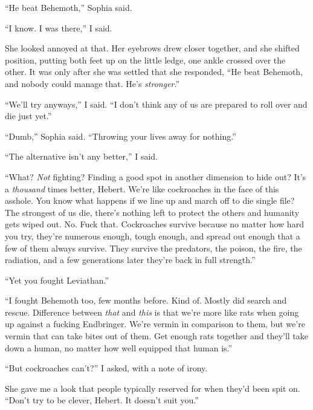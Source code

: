 ``He beat Behemoth,'' Sophia said.



``I know.  I was there,'' I said.



She looked annoyed at that.  Her eyebrows drew closer together, and she shifted position, putting both feet up on the little ledge, one ankle crossed over the other.  It was only after she was settled that she responded, ``He beat Behemoth, and nobody could manage that.  He's \emph{stronger}.''



``We'll try anyways,'' I said.  ``I don't think any of us are prepared to roll over and die just yet.''



``Dumb,'' Sophia said.  ``Throwing your lives away for nothing.''



``The alternative isn't any better,'' I said.



``What?  \emph{Not} fighting?  Finding a good spot in another dimension to hide out?  It's a \emph{thousand} times better, Hebert.  We're like cockroaches in the face of this asshole.  You know what happens if we line up and march off to die single file?  The strongest of us die, there's nothing left to protect the others and humanity gets wiped out.  No.  Fuck that.  Cockroaches survive because no matter how hard you try, they're numerous enough, tough enough, and spread out enough that a few of them always survive.  They survive the predators, the poison, the fire, the radiation, and a few generations later they're back in full strength.''



``Yet you fought Leviathan.''



``I fought Behemoth too, few months before.  Kind of.  Mostly did search and rescue.  Difference between \emph{that} and \emph{this} is that we're more like rats when going up against a fucking Endbringer.  We're vermin in comparison to them, but we're vermin that can take bites out of them.  Get enough rats together and they'll take down a human, no matter how well equipped that human is.''



``But cockroaches can't?''  I asked, with a note of irony.



She gave me a look that people typically reserved for when they'd been spit on.  ``Don't try to be clever, Hebert.  It doesn't suit you.''



